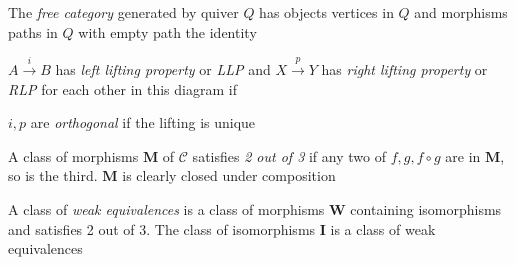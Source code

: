 \documentclass[main]{subfiles}
\begin{document}
\begin{definition}
The \textit{free category} generated by quiver $Q$ has objects vertices in $Q$ and morphisms paths in $Q$ with empty path the identity
\end{definition}

\begin{definition}
$A\xrightarrow{i}B$ has \textit{left lifting property} or \textit{LLP} and $X\xrightarrow{p}Y$ has \textit{right lifting property} or \textit{RLP} for each other in this diagram if
\begin{center}
\end{center}
$i,p$ are \textit{orthogonal} if the lifting is unique
\end{definition}

\begin{definition}
A class of morphisms $\mathbf M$ of $\mathscr C$ satisfies \textit{2 out of 3} if any two of $f,g,f\circ g$ are in $\mathbf M$, so is the third. $\mathbf M$ is clearly closed under composition \par
A class of \textit{weak equivalences} is a class of morphisms $\mathbf W$ containing isomorphisms and satisfies 2 out of 3. The class of isomorphisms $\mathbf I$ is a class of weak equivalences
\end{definition}
\end{document}
